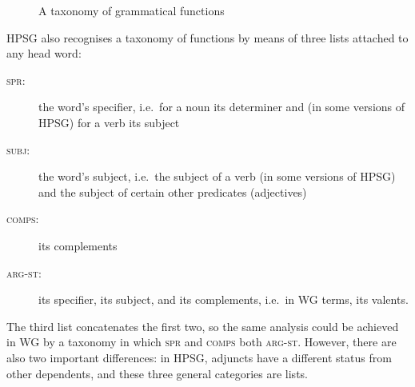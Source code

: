 \documentclass[output=paper,biblatex,babelshorthands,newtxmath,draftmode,colorlinks,citecolor=brown]{langscibook}
\begin{document}
\begin{figure}
	\centering
{}
	\caption{A taxonomy of grammatical functions}
	\label{fig:17}
\end{figure}

HPSG also recognises a taxonomy of functions by means of three lists attached to any head word:

\begin{description}
\item[\textnormal{\textsc{spr}:}] \label{it:spr} the word's specifier, i.e.\ for a noun its determiner and (in some versions of HPSG) for a verb its subject
	
\item[\textnormal{\textsc{subj}:}] \label{it:subj} the word's subject, i.e.\ the subject of a verb
  (in some versions of HPSG) and the subject of certain other predicates (\eguk adjectives)

\item[\textnormal{\textsc{comps}:}] \label{it:comps} its complements
	
\item[\textnormal{\textsc{arg-st}:}] \label{it:arg-st} its specifier, its subject, and its complements, i.e.\ in
  WG terms, its valents.
\end{description}

\noindent
The third list concatenates the first two, so the same analysis could be achieved in WG by a
taxonomy in which \textsc{spr} and \textsc{comps} both  \textsc{arg-st}. However, there are
also two important differences: in HPSG, adjuncts have a different status from other dependents, and
these three general categories are lists.
\end{document}
